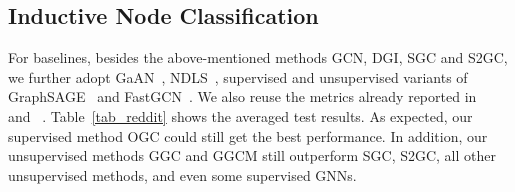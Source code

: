 \vspace{-5pt}
\subsection{Inductive Node Classification}
\vspace{-5pt}
For baselines, besides the above-mentioned methods GCN, DGI, SGC and S2GC, we further adopt GaAN~\citep{zhang2018gaan}, NDLS~\citep{zhang2021node}, supervised and unsupervised variants of GraphSAGE~\citep{hamilton2017inductive} and FastGCN~\citep{chen2018fastgcn}.
We also reuse the metrics already reported in ~\citet{wu2019simplifying} and ~\citet{chen2018fastgcn}.
Table~\ref{tab_reddit} shows the averaged test results. As expected, our supervised method OGC could still get the best performance.
In addition, our unsupervised methods GGC and GGCM still outperform SGC, S2GC, all other unsupervised methods, and even some supervised GNNs.


